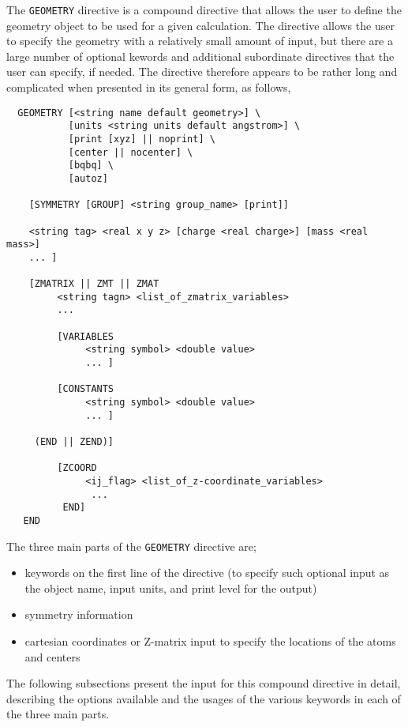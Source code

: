 \label{sec:geom}

The \verb+GEOMETRY+ directive is a compound directive that allows the
user to define the geometry object to be used for a given calculation.
The directive allows the user to specify the geometry 
with a relatively small amount of input, but there are a large number of
optional kewords and additional subordinate directives that the user can
specify, if needed.  The directive therefore appears to be rather
long and complicated when presented in its general form, as follows,
\begin{verbatim}
  GEOMETRY [<string name default geometry>] \
           [units <string units default angstrom>] \
           [print [xyz] || noprint] \
           [center || nocenter] \
           [bqbq] \
           [autoz]
    
    [SYMMETRY [GROUP] <string group_name> [print]]

    <string tag> <real x y z> [charge <real charge>] [mass <real mass>]
    ... ]

    [ZMATRIX || ZMT || ZMAT
         <string tagn> <list_of_zmatrix_variables>
         ... 

         [VARIABLES
              <string symbol> <double value>
              ... ]
 
         [CONSTANTS
              <string symbol> <double value>
              ... ]

     (END || ZEND)]

         [ZCOORD
              <ij_flag> <list_of_z-coordinate_variables>
               ...
          END]
   END
\end{verbatim}

The three main parts of the \verb+GEOMETRY+ directive
are;

\begin{itemize}
\item keywords on the first line of the directive (to specify such optional
input as the object name, input units, and print level for the output)
\item symmetry information
\item cartesian coordinates or Z-matrix input to specify the locations 
of the atoms and centers
\end{itemize}

The following subsections present the input for this compound directive in
detail, describing the options available and the usages of the various
keywords in each of the three main parts.



